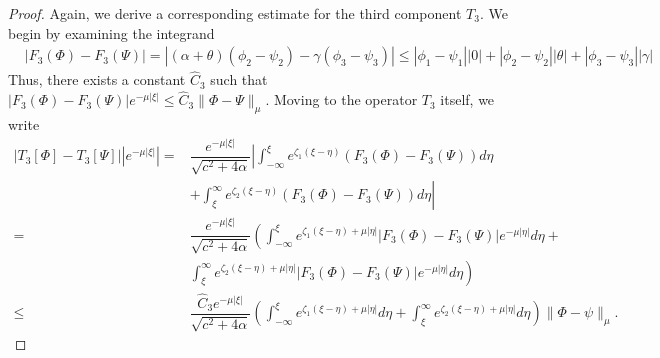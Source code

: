 \documentclass[11pt]{article}
\theoremstyle{definition}
\begin{document}
{\begin{proof}
Again, we derive a corresponding estimate for the third component $T_{3}$.  
We begin by examining the integrand
\begin{align}
   \nonumber& |F_3(\Phi)- F_3(\Psi)|=|(\alpha+\theta)(\phi_2-\psi_2)-\gamma(\phi_3-\psi_3)|\le |\phi_1-\psi_1||0|+|\phi_2-\psi_2||\theta|+|\phi_3-\psi_3||\gamma|
\end{align}
        Thus, there exists a constant $\widehat C_3$ such that $|F_3(\Phi)-F_3(\Psi)|e^{-\mu|\xi|}\le \widehat{C}_3\|\Phi-\Psi\|_\mu$. Moving to the operator $T_3$ itself, we write
\begin{align}
    |T_3[\Phi]-T_3[\Psi]||e^{- \mu |\xi|}|= &\dfrac{e^{-\mu |\xi|}}{\sqrt{c^2+ 4  \alpha}}\left|\int_{- \infty}^{\xi}e^{\zeta_1(\xi-\eta)}\left(F_3(\Phi)- F_3(\Psi)\right) d \eta \right. \\   & \left.
 + \int_{\xi}^{\infty }e^{\zeta_2(\xi-\eta)}\left(F_3(\Phi)- F_3(\Psi)\right) d \eta  \right| \\ =& \dfrac{e^{-\mu |\xi|}}{\sqrt{c^2+ 4 \alpha}}\left(\int_{- \infty}^{\xi}e^{\zeta_1(\xi-\eta) + \mu|\eta|}\left|F_3(\Phi)- F_3(\Psi)\right|e^{-\mu |\eta|} d \eta 
  \right. + \\ &\left. \int_{\xi}^{\infty }e^{\zeta_2(\xi-\eta)+ \mu|\eta|}\left|F_3(\Phi)- F_3(\Psi)\right|e^{-\mu |\eta|} d \eta  \right) \\ \leq &\dfrac{{\widehat C_3} e^{-\mu |\xi|}}{\sqrt{c^2+ 4 \alpha}}\left(\int_{- \infty}^{\xi}e^{\zeta_1(\xi-\eta)+ \mu|\eta|} d \eta 
 + \int_{\xi}^{\infty }e^{\zeta_2(\xi-\eta)+ \mu|\eta|} d \eta  \right)\|\Phi-\psi\|_\mu.
\end{align}


\end{proof}}
\end{document}
